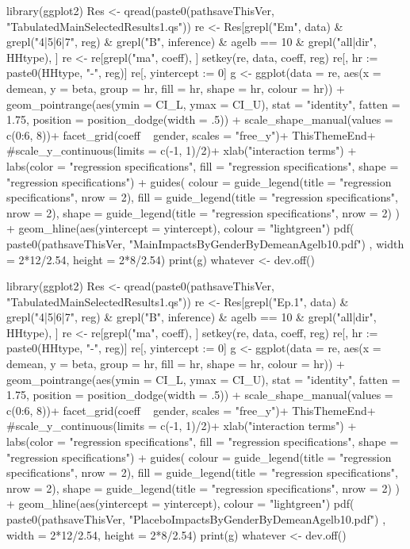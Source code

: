 \begin{Schunk}
\begin{Sinput}
library(ggplot2)
Res <- qread(paste0(pathsaveThisVer, "TabulatedMainSelectedResults1.qs"))
re <- Res[grepl("Em", data) & grepl("4|5|6|7", reg) & grepl("B", inference)
   & agelb == 10 & grepl("all|dir", HHtype), ]
re <- re[grepl("ma", coeff), ]
setkey(re, data, coeff, reg)
re[, hr := paste0(HHtype, "-", reg)]
re[, yintercept := 0]
g <- ggplot(data = re, 
    aes(x = demean, y = beta, group = hr, fill = hr, shape = hr, colour = hr)) + 
  geom_pointrange(aes(ymin = CI_L, ymax = CI_U),
    stat = "identity", fatten = 1.75, 
    position = position_dodge(width = .5)) +
  scale_shape_manual(values = c(0:6, 8))+
  facet_grid(coeff ~ gender, scales = "free_y")+
  ThisThemeEnd+
  #scale_y_continuous(limits = c(-1, 1)/2)+
  xlab("interaction terms") + 
  labs(color  = "regression specifications", fill = "regression specifications", 
    shape = "regression specifications") +
  guides(
    colour = guide_legend(title = "regression specifications", nrow = 2),
    fill = guide_legend(title = "regression specifications", nrow = 2),
    shape = guide_legend(title = "regression specifications", nrow = 2)
    ) +
  geom_hline(aes(yintercept = yintercept), colour = "lightgreen")
pdf(
  paste0(pathsaveThisVer, "MainImpactsByGenderByDemeanAgelb10.pdf")
  , width = 2*12/2.54, height = 2*8/2.54)
print(g)
whatever <- dev.off()
\end{Sinput}
\end{Schunk}
\begin{Schunk}
\begin{Sinput}
library(ggplot2)
Res <- qread(paste0(pathsaveThisVer, "TabulatedMainSelectedResults1.qs"))
re <- Res[grepl("Ep.1", data) & grepl("4|5|6|7", reg) & grepl("B", inference)
   & agelb == 10 & grepl("all|dir", HHtype), ]
re <- re[grepl("ma", coeff), ]
setkey(re, data, coeff, reg)
re[, hr := paste0(HHtype, "-", reg)]
re[, yintercept := 0]
g <- ggplot(data = re, 
    aes(x = demean, y = beta, group = hr, fill = hr, shape = hr, colour = hr)) + 
  geom_pointrange(aes(ymin = CI_L, ymax = CI_U),
    stat = "identity", fatten = 1.75, 
    position = position_dodge(width = .5)) +
  scale_shape_manual(values = c(0:6, 8))+
  facet_grid(coeff ~ gender, scales = "free_y")+
  ThisThemeEnd+
  #scale_y_continuous(limits = c(-1, 1)/2)+
  xlab("interaction terms") + 
  labs(color  = "regression specifications", fill = "regression specifications", 
    shape = "regression specifications") +
  guides(
    colour = guide_legend(title = "regression specifications", nrow = 2),
    fill = guide_legend(title = "regression specifications", nrow = 2),
    shape = guide_legend(title = "regression specifications", nrow = 2)
    ) +
  geom_hline(aes(yintercept = yintercept), colour = "lightgreen")
pdf(
  paste0(pathsaveThisVer, "PlaceboImpactsByGenderByDemeanAgelb10.pdf")
  , width = 2*12/2.54, height = 2*8/2.54)
print(g)
whatever <- dev.off()
\end{Sinput}
\end{Schunk}
